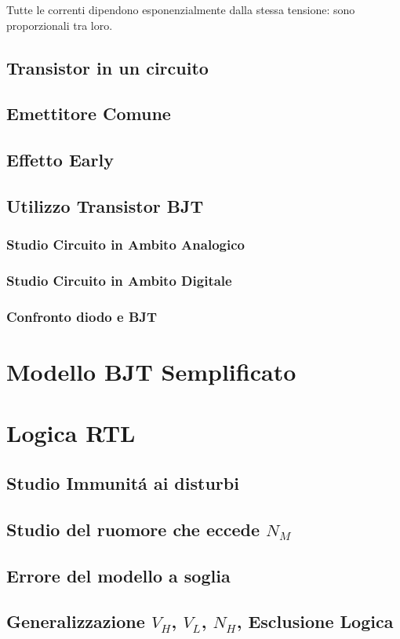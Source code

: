 \documentclass{article}
\begin{document}
Tutte le correnti dipendono esponenzialmente dalla stessa tensione: sono proporzionali tra loro.

\subsection{Transistor in un circuito}
\subsection{Emettitore Comune}
\subsection{Effetto Early}
\subsection{Utilizzo Transistor BJT}
\subsubsection{Studio Circuito in Ambito Analogico}
\subsubsection{Studio Circuito in Ambito Digitale}
\subsubsection{Confronto diodo e BJT}
\section{Modello BJT Semplificato}
\section{Logica RTL}
\subsection{Studio Immunit\'a ai disturbi}
\subsection{Studio del ruomore che eccede $N_M$}
\subsection{Errore del modello a soglia}
\subsection{Generalizzazione $V_H$, $V_L$, $N_H$, Esclusione Logica}
\end{document}

